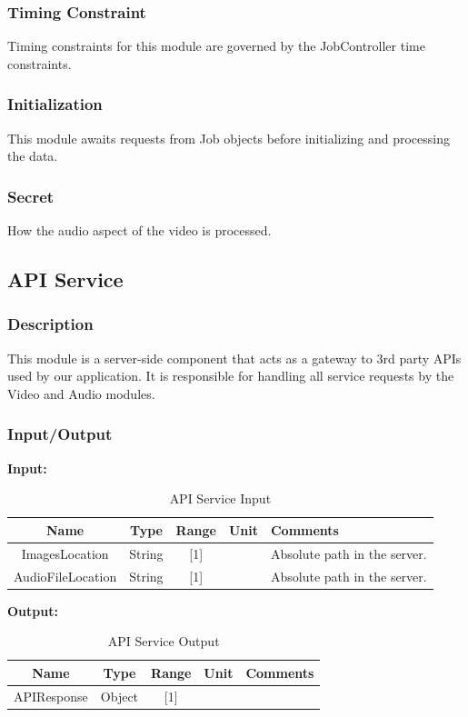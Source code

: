\documentclass{article}
\begin{document}
\subsubsection{Timing Constraint}
Timing constraints for this module are governed by the JobController time constraints. 

\subsubsection{Initialization}
This module awaits requests from Job objects before initializing and processing the data.

\subsubsection{Secret}
How the audio aspect of the video is processed.

\subsection{API Service}

\subsubsection{Description}
This module is a server-side component that acts as a gateway to 3rd party APIs used by our application. It is responsible for handling all service requests by the Video and Audio modules.

\subsubsection{Input/Output}
\textbf{Input:}
\begin{table}[H]
    \caption{API Service Input}
    \centering
    \begin{tabularx}{0.7\textwidth}{|c|c|c|c|X|} \hline
        \textbf{Name} & \textbf{Type} & \textbf{Range} & \textbf{Unit} & \textbf{Comments} \\ \hline
        ImagesLocation & String & [1] & & Absolute path in the server. \\ \hline
        AudioFileLocation & String & [1] & & Absolute path in the server. \\ \hline
    \end{tabularx}
    \label{tab:API_Service_Input}
\end{table}

\textbf{Output:}
\begin{table}[H]
    \caption{API Service Output} 
    \centering
    \begin{tabularx}{0.7\textwidth}{|c|c|c|c|X|} \hline
        \textbf{Name} & \textbf{Type} & \textbf{Range} & \textbf{Unit} & \textbf{Comments} \\ \hline
        APIResponse & Object & [1] & & \\ \hline
    \end{tabularx}
    \label{tab:API_Service_Output}
\end{table}
\end{document}
